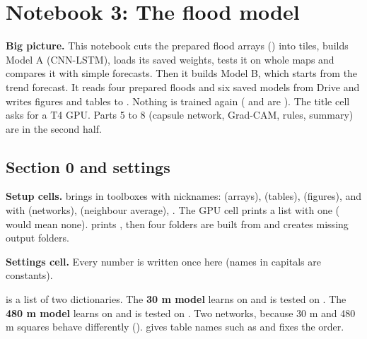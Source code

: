 \sloppy
\section{Notebook 3: The flood model}\label{ch:nb-model}

\textbf{Big picture.} This notebook cuts the prepared flood arrays () into tiles, builds Model A (CNN-LSTM), loads its saved weights, tests it on whole maps and compares it with simple forecasts. Then it builds Model B, which starts from the trend forecast.
It reads four prepared floods and six saved models from Drive and writes figures and tables to . Nothing is trained again ( and  are ). The title cell asks for a T4 GPU. Parts 5 to 8 (capsule network, Grad-CAM, rules, summary) are in the second half.

\subsection{Section 0 and settings}

\textbf{Setup cells.}  brings in toolboxes with nicknames:  (arrays),  (tables),  (figures),  and  with  (networks),  (neighbour average), . The GPU cell prints a list with one  (\cd{[]} would mean none).  prints , then four folders are built from  and  creates missing output folders.

\textbf{Settings cell.} Every number is written once here (names in capitals are constants).


 is a list of two dictionaries. The \textbf{30 m model} learns on  and is tested on . The \textbf{480 m model} learns on  and is tested on . Two networks, because 30 m and 480 m squares behave differently ().  gives table names such as  and fixes the order.

